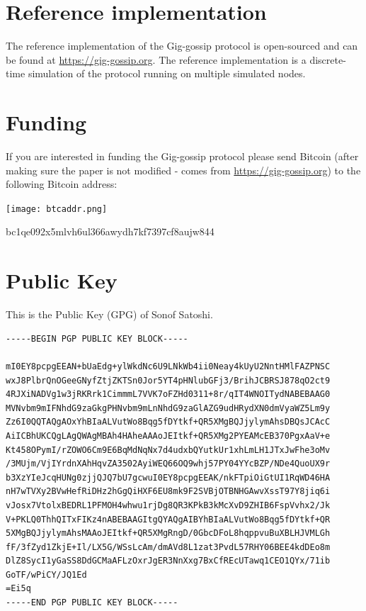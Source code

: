 \documentclass{article}
\begin{document}
\section{Reference implementation}
The reference implementation of the Gig-gossip protocol is open-sourced and can be found at \url{https://gig-gossip.org}. The reference implementation is a discrete-time simulation of the protocol running on multiple simulated nodes.

\section{Funding}
If you are interested in funding the Gig-gossip protocol please send Bitcoin (after making sure the paper is not modified - comes from \url{https://gig-gossip.org}) to the following Bitcoin address:

\texttt{[image: btcaddr.png]}

bc1qe092x5mlvh6ul366awydh7kf7397cf8aujw844

\section{Public Key}
This is the Public Key (GPG) of Sonof Satoshi.
\label{gpgkey}
\begin{small}
\begin{verbatim}
-----BEGIN PGP PUBLIC KEY BLOCK-----

mI0EY8pcpgEEAN+bUaEdg+ylWkdNc6U9LNkWb4ii0Neay4kUyU2NntHMlFAZPNSC
wxJ8PlbrQnOGeeGNyfZtjZKTSn0Jor5YT4pHNlubGFj3/BrihJCBRSJ878qO2ct9
4RJXiNADVg1w3jRKRrk1CimmmL7VVK7oFZHd0311+8r/qIT4WNOITydNABEBAAG0
MVNvbm9mIFNhdG9zaGkgPHNvbm9mLnNhdG9zaGlAZG9udHRydXN0dmVyaWZ5Lm9y
Zz6I0QQTAQgAOxYhBIaALVutWo8Bqg5fDYtkf+QR5XMgBQJjylymAhsDBQsJCAcC
AiICBhUKCQgLAgQWAgMBAh4HAheAAAoJEItkf+QR5XMg2PYEAMcEB370PgxAaV+e
Kt458OPymI/rZOWO6Cm9E6BqMdNqNx7d4udxbQYutkUr1xhLmLH1JTxJwFhe3oMv
/3MUjm/VjIYrdnXAhHqvZA3502AyiWEQ66OQ9whj57PY04YYcBZP/NDe4QuoUX9r
b3XzYIeJcqHUNg0zjjQJQ7bU7gcwuI0EY8pcpgEEAK/nkFTpiOiGtUI1RqWD46HA
nH7wTVXy2BVwHefRiDHz2hGgQiHXF6EU8mk9F2SVBjOTBNHGAwvXssT97Y8jiq6i
vJosx7VtolxBEDRL1PFMOH4whwu1rjDg8QR3KPkB3kMcXvD9ZHIB6FspVvhx2/Jk
V+PKLQ0ThhQITxFIKz4nABEBAAGItgQYAQgAIBYhBIaALVutWo8Bqg5fDYtkf+QR
5XMgBQJjylymAhsMAAoJEItkf+QR5XMgRngD/0GbcDFoL8hqppvuBuXBLHJVMLGh
fF/3fZyd1ZkjE+Il/LX5G/WSsLcAm/dmAVd8L1zat3PvdL57RHY06BEE4kdDEo8m
DlZ8SycI1yGaSS8DdGCMaAFLzOxrJgER3NnXxg7BxCfREcUTawq1CEO1QYx/71ib
GoTF/wPiCY/JQ1Ed
=Ei5q
-----END PGP PUBLIC KEY BLOCK-----
\end{verbatim}
\end{small}



  
\end{document}
